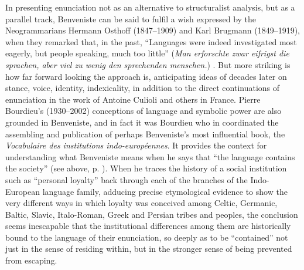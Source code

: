 \documentclass[output=paper]{langscibook}
\begin{document}
In presenting enunciation not as an alternative to structuralist analysis, but as a parallel track, Benveniste can be said to fulfil a wish expressed by the Neogrammarians Hermann Osthoff (1847--1909) and Karl Brugmann (1849--1919), when they remarked that, in the past, ``Languages were indeed investigated most eagerly, but people speaking, much too little'' (\emph{Man erforschte zwar eifrigst die \emph{sprachen}, aber viel zu wenig \emph{den sprechenden menschen}.}) \citep[iii]{OsthoffBrugmann1878}. But more striking is how far forward looking the approach is, anticipating ideas of decades later on stance, voice, identity, indexicality, in addition to the direct continuations of enunciation in the work of Antoine Culioli and others in France. Pierre Bourdieu's (1930--2002) conceptions of language and symbolic power are also grounded in Benveniste, and in fact it was Bourdieu who in \citeyear{Benveniste1969vocabulaire} coordinated the assembling and publication of perhaps Benveniste's most influential book, the \emph{Vocabulaire des institutions indo-européennes}. It provides the context for understanding what Benveniste means when he says that ``the language contains the society'' (see above, p. \pageref{q:joseph:langcontainssoc}). When he traces the history of a social institution such as ``personal loyalty'' back through each of the branches of the Indo-European language family, adducing precise etymological evidence to show the very different ways in which loyalty was conceived among Celtic, Germanic, Baltic, Slavic, Italo-Roman, Greek and Persian tribes and peoples, the conclusion seems inescapable that the institutional differences among them are historically bound to the language of their enunciation, so deeply as to be ``contained'' not just in the sense of residing within, but in the stronger sense of being prevented from escaping.
\end{document}
